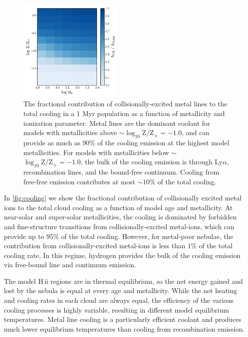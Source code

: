 \documentclass[twocolumn, tighten]{aastex61}
\newcommand{\Fig}[1]{\autoref{fig:#1}}
\newcommand{\logten}{\ensuremath{\log_{10}}}
\newcommand{\hii}{H\,{\sc ii}\xspace}
\newcommand{\logZeq}[1]{\ensuremath{\logten \mathrm{Z}/\mathrm{Z}_{\sun} = #1}}
\begin{document}
\begin{figure} %
  \begin{centering}
    \includegraphics[width=0.45\textwidth]{f5.pdf}
    \caption{The fractional contribution of collisionally-excited metal lines to the total cooling in a 1 Myr population as a function of metallicity and ionization parameter. Metal lines are the dominant coolant for models with metallicities above $\sim$\logZeq{-1.0}, and can provide as much as 90\% of the cooling emission at the highest model metallicities. For models with metallicities below $\sim$\logZeq{-1.0}, the bulk of the cooling emission is through Ly$\alpha$, recombination lines, and the bound-free continuum. Cooling from free-free emission contributes at most ${\sim}10\%$ of the total cooling. }
    \label{fig:cooling}
  \end{centering}
\end{figure}

In \Fig{cooling} we show the fractional contribution of collisionally excited metal ions to the total cloud cooling as a function of model age and metallicity. At near-solar and super-solar metallicities, the cooling is dominated by forbidden and fine-structure transitions from collisionally-excited metal-ions, which can provide up to 95\% of the total cooling. However, for metal-poor nebulae, the contribution from collisionally-excited metal-ions is less than $1\%$ of the total cooling rate. In this regime, hydrogen provides the bulk of the cooling emission via free-bound line and continuum emission.

The model \hii regions are in thermal equilibrium, so the net energy gained and lost by the nebula is equal at every age and metallicity. While the net heating and cooling rates in each cloud are always equal, the efficiency of the various cooling processes is highly variable, resulting in different model equilibrium temperatures. Metal line cooling is a particularly efficient coolant and produces much lower equilibrium temperatures than cooling from recombination emission.
\end{document}
